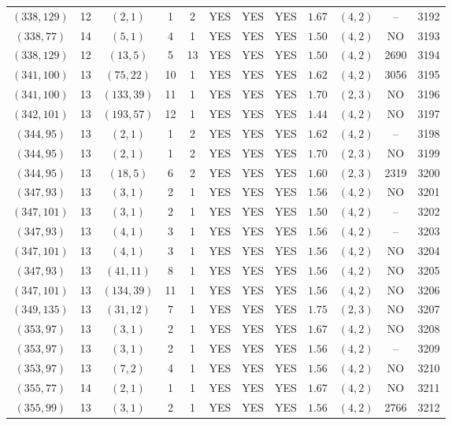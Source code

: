 \begin{longtable}{|c|c|c|c|c|c|c|c|c|c|c|c|}
$(338,129)$ & 12 & $(2,1)$ & 1 & 2 & YES & YES & YES & $1.67$ & $(4,2)$ & -- & 3192\\
$(338,77)$ & 14 & $(5,1)$ & 4 & 1 & YES & YES & YES & $1.50$ & $(4,2)$ & NO & 3193\\
$(338,129)$ & 12 & $(13,5)$ & 5 & 13 & YES & YES & YES & $1.50$ & $(4,2)$ & 2690 & 3194\\
$(341,100)$ & 13 & $(75,22)$ & 10 & 1 & YES & YES & YES & $1.62$ & $(4,2)$ & 3056 & 3195\\
$(341,100)$ & 13 & $(133,39)$ & 11 & 1 & YES & YES & YES & $1.70$ & $(2,3)$ & NO & 3196\\
$(342,101)$ & 13 & $(193,57)$ & 12 & 1 & YES & YES & YES & $1.44$ & $(4,2)$ & NO & 3197\\
$(344,95)$ & 13 & $(2,1)$ & 1 & 2 & YES & YES & YES & $1.62$ & $(4,2)$ & -- & 3198\\
$(344,95)$ & 13 & $(2,1)$ & 1 & 2 & YES & YES & YES & $1.70$ & $(2,3)$ & NO & 3199\\
$(344,95)$ & 13 & $(18,5)$ & 6 & 2 & YES & YES & YES & $1.60$ & $(2,3)$ & 2319 & 3200\\
$(347,93)$ & 13 & $(3,1)$ & 2 & 1 & YES & YES & YES & $1.56$ & $(4,2)$ & NO & 3201\\
$(347,101)$ & 13 & $(3,1)$ & 2 & 1 & YES & YES & YES & $1.50$ & $(4,2)$ & -- & 3202\\
$(347,93)$ & 13 & $(4,1)$ & 3 & 1 & YES & YES & YES & $1.56$ & $(4,2)$ & -- & 3203\\
$(347,101)$ & 13 & $(4,1)$ & 3 & 1 & YES & YES & YES & $1.56$ & $(4,2)$ & NO & 3204\\
$(347,93)$ & 13 & $(41,11)$ & 8 & 1 & YES & YES & YES & $1.56$ & $(4,2)$ & NO & 3205\\
$(347,101)$ & 13 & $(134,39)$ & 11 & 1 & YES & YES & YES & $1.56$ & $(4,2)$ & NO & 3206\\
$(349,135)$ & 13 & $(31,12)$ & 7 & 1 & YES & YES & YES & $1.75$ & $(2,3)$ & NO & 3207\\
$(353,97)$ & 13 & $(3,1)$ & 2 & 1 & YES & YES & YES & $1.67$ & $(4,2)$ & NO & 3208\\
$(353,97)$ & 13 & $(3,1)$ & 2 & 1 & YES & YES & YES & $1.56$ & $(4,2)$ & -- & 3209\\
$(353,97)$ & 13 & $(7,2)$ & 4 & 1 & YES & YES & YES & $1.56$ & $(4,2)$ & NO & 3210\\
$(355,77)$ & 14 & $(2,1)$ & 1 & 1 & YES & YES & YES & $1.67$ & $(4,2)$ & NO & 3211\\
$(355,99)$ & 13 & $(3,1)$ & 2 & 1 & YES & YES & YES & $1.56$ & $(4,2)$ & 2766 & 3212\\

\end{longtable}
